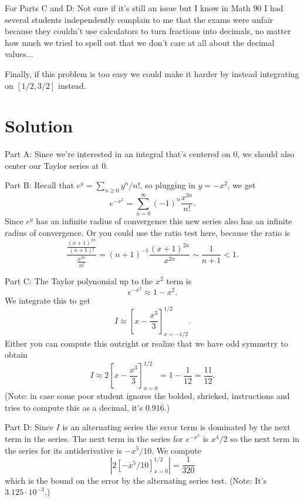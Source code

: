 \documentclass[10pt]{article}
\theoremstyle{definition}
\begin{document}
For Parts C and D: Not sure if it's still an issue but I know in Math 90 I had several students independently complain to me that the exams were unfair because they couldn't use calculators to turn fractions into decimals, no matter how much we tried to spell out that we don't care at all about the decimal values...

Finally, if this problem is too easy we could make it harder by instead integrating on $[1/2, 3/2]$ instead.

\section{Solution}
Part A: Since we're interested in an integral that's centered on $0$, we should also center our Taylor series at $0$.

Part B: Recall that $e^y = \sum_{n \geq 0} y^n/n!$, so plugging in $y = -x^2$, we get 
$$e^{-x^2} = \sum_{n = 0}^\infty (-1)^n \frac{x^{2n}}{n!}.$$
Since $e^y$ has an infinite radius of convergence this new series also has an infinite radius of convergence. Or you could use the ratio test here, because the ratio is 
$$\frac{\frac{(x + 1)^{2n}}{(n+1)!}}{\frac{x^{2n}}{n!}} = (n + 1)^{-1} \frac{(x + 1)^{2n}}{x^{2n}} \sim \frac{1}{n + 1} < 1.$$

Part C: The Taylor polynomial up to the $x^2$ term is
$$e^{-x^2} \approx 1 - x^2.$$
We integrate this to get 
$$I \approx \left[x - \frac{x^3}{3}\right]_{x = -1/2}^{1/2}.$$
Either you can compute this outright or realize that we have odd symmetry to obtain 
$$I \approx 2\left[x - \frac{x^3}{3}\right]_{x = 0}^{1/2} = 1 - \frac{1}{12} = \frac{11}{12}.$$
(Note: in case some poor student ignores the bolded, shrieked, instructions and tries to compute this as a decimal, it's $0.91\overline 6$.)

Part D: Since $I$ is an alternating series the error term is dominated by the next term in the series.
The next term in the series for $e^{-x^2}$ is $x^4/2$ so the next term in the series for its antiderivative is $-x^5/10$. We compute 
$$\left|2[-x^5/10]_{x = 0}^{1/2}\right| = \frac{1}{320}$$
which is the bound on the error by the alternating series test. (Note: It's $3.125 \cdot 10^{-3}$.)
\end{document}
